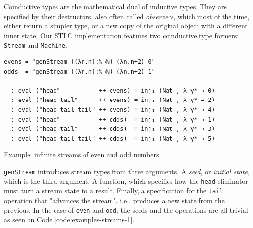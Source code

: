 Coinductive types are the mathematical dual of inductive types. They are specified by their destructors, also often called \textit{observers}, which most of the time, either return a simpler type, or a new copy of the original object with a different inner state. Our STLC implementation features two coinductive type formers: \verb$Stream$ and \verb$Machine$.

\begin{listing}[H]
\begin{verbatim}
evens = "genStream ((λn.n):ℕ→ℕ) (λn.n+2) 0"
odds  = "genStream ((λn.n):ℕ→ℕ) (λn.n+2) 1"

_ : eval ("head"           ++ evens) ≡ inj₁ (Nat , λ γ* → 0)
_ : eval ("head tail"      ++ evens) ≡ inj₁ (Nat , λ γ* → 2)
_ : eval ("head tail tail" ++ evens) ≡ inj₁ (Nat , λ γ* → 4)
_ : eval ("head"           ++ odds)  ≡ inj₁ (Nat , λ γ* → 1)
_ : eval ("head tail"      ++ odds)  ≡ inj₁ (Nat , λ γ* → 3)
_ : eval ("head tail tail" ++ odds)  ≡ inj₁ (Nat , λ γ* → 5)
\end{verbatim}
\caption{Example: infinite streams of even and odd numbers}
\label{code:examples-streams-1}
\end{listing}

\verb$genStream$ introduces stream types from three arguments. A \textit{seed}, or \textit{initial state}, which is the third argument. A function, which specifies how the \verb$head$ eliminator must turn a stream state to a result. Finally, a specification for the \verb$tail$ operation that "advances the stream", i.e., produces a new state from the previous. In the case of \verb$even$ and \verb$odd$, the seeds and the operations are all trivial as seen on Code \ref{code:examples-streams-1}.

